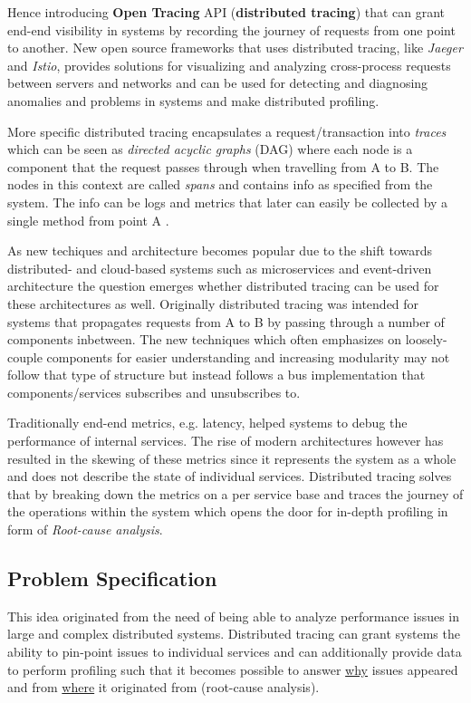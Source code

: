 \documentclass[10pt, titlepage, oneside, a4paper]{article}
\begin{document}
Hence introducing \textbf{Open Tracing} API (\textbf{distributed tracing}) that can grant end-end visibility in systems by recording the journey of requests from one point to another. New open source frameworks that uses distributed tracing, like \textit{Jaeger} and \textit{Istio}, provides solutions for visualizing and analyzing cross-process requests between servers and networks and can be used for detecting and diagnosing anomalies and problems in systems and make distributed profiling. 


More specific distributed tracing encapsulates a request/transaction into \textit{traces} which can be seen as \textit{directed acyclic graphs} (DAG) where each node is a component that the request passes through when travelling from A to B. The nodes in this context are called \textit{spans} and contains info as specified from the system. The info can be logs and metrics that later can easily be collected by a single method from point A \cite{wp}\cite{ot}. 


As new techiques and architecture becomes popular due to the shift towards distributed- and cloud-based systems such as microservices and event-driven architecture the question emerges whether distributed tracing can be used for these architectures as well. Originally distributed tracing was intended for systems that propagates requests from A to B by passing through a number of components inbetween. The new techniques which often emphasizes on loosely-couple components for easier understanding and increasing modularity may not follow that type of structure but instead follows a bus implementation that components/services subscribes and unsubscribes to.  

Traditionally end-end metrics, e.g. latency, helped systems to debug the performance of internal services. The rise of modern architectures however has resulted in the skewing of these metrics since it represents the system as a whole and does not describe the state of individual services. Distributed tracing solves that by breaking down the metrics on a per service base and traces the journey of the operations within the system which opens the door for in-depth profiling in form of \textit{Root-cause analysis}.

\subsection{Problem Specification}
This idea originated from the need of being able to analyze performance issues in large and complex distributed systems. Distributed tracing can grant systems the ability to pin-point issues to individual services and can additionally provide data to perform profiling such that it becomes possible to answer \underline{why} issues appeared and from \underline{where} it originated from (root-cause analysis). 
\end{document}

